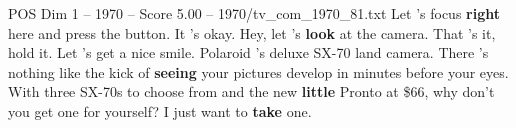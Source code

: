 \begin{textsample}{POS Dim 1 – 1970 – Score 5.00 – 1970/tv\_com\_1970\_81.txt}  \label{ex:f1_pos_033}
Let 's focus \textbf{right} here and press the button.
It 's okay.
Hey, let 's \textbf{look} at the camera.
That 's it, hold it.
Let 's get a nice smile.
Polaroid 's deluxe SX-70 land camera.
There 's nothing like the kick of \textbf{seeing} your pictures develop in minutes before your eyes.
With three SX-70s to choose from and the new \textbf{little} Pronto at \$66, why don't you get one for yourself?
I just want to \textbf{take} one.

\end{textsample}
